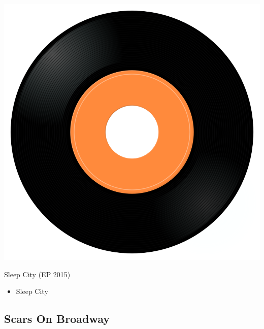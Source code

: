 \begin{minipage}[t]{0.25\textwidth}
\captionsetup{type=figure}
\includegraphics[width=\textwidth]{Images/cover.png}
\caption*{Sleep City (EP 2015)}
\end{minipage}
\begin{minipage}[t]{0.25\textwidth}\vspace{0pt}
\begin{itemize}[nosep,leftmargin=1em,labelwidth=*,align=left]
	\setlength{\itemsep}{0pt}
	\item Sleep City
\end{itemize}
\end{minipage}

\subsection{Scars On Broadway}

